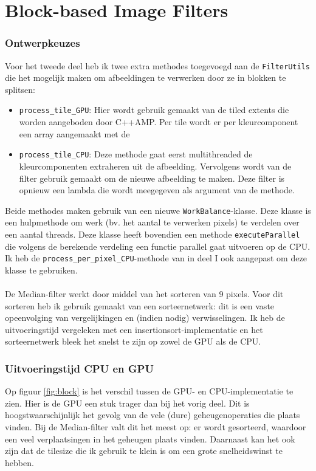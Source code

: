\documentclass[12pt]{article}
\begin{document}
\part{Block-based Image Filters}

\section*{Ontwerpkeuzes}

Voor het tweede deel heb ik twee extra methodes toegevoegd aan de {\tt FilterUtils} die het mogelijk maken om afbeeldingen te verwerken door ze in blokken te splitsen:

\begin{itemize}
    \item {\tt process\_tile\_GPU}: Hier wordt gebruik gemaakt van de tiled extents die worden aangeboden door C++AMP.
Per tile wordt er per kleurcomponent een array aangemaakt met de  
    \item {\tt process\_tile\_CPU}: Deze methode gaat eerst multithreaded de kleurcomponenten extraheren uit de afbeelding.
Vervolgens wordt van de filter gebruik gemaakt om de nieuwe afbeelding te maken.
Deze filter is opnieuw een lambda die wordt meegegeven als argument van de methode.
\end{itemize}

Beide methodes maken gebruik van een nieuwe {\tt WorkBalance}-klasse.
Deze klasse is een hulpmethode om werk (bv.
het aantal te verwerken pixels) te verdelen over een aantal threads.
Deze klasse heeft bovendien een methode {\tt executeParallel} die volgens de berekende verdeling een functie parallel gaat uitvoeren op de CPU.
Ik heb de {\tt process\_per\_pixel\_CPU}-methode van in deel I ook aangepast om deze klasse te gebruiken.
\\
\\
De Median-filter werkt door middel van het sorteren van 9 pixels.
Voor dit sorteren heb ik gebruik gemaakt van een sorteernetwerk: dit is een vaste opeenvolging van vergelijkingen en (indien nodig) verwisselingen.
Ik heb de uitvoeringstijd vergeleken met een insertionsort-implementatie en het sorteernetwerk bleek het snelst te zijn op zowel de GPU als de CPU.

\section*{Uitvoeringstijd CPU en GPU}

Op figuur \ref{fig:block} is het verschil tussen de GPU- en CPU-implementatie te zien.
Hier is de GPU een stuk trager dan bij het vorig deel.
Dit is hoogstwaarschijnlijk het gevolg van de vele (dure) geheugenoperaties die plaats vinden.
Bij de Median-filter valt dit het meest op: er wordt gesorteerd, waardoor een veel verplaatsingen in het geheugen plaats vinden.
Daarnaast kan het ook zijn dat de tilesize die ik gebruik te klein is om een grote snelheidswinst te hebben.
\end{document}
